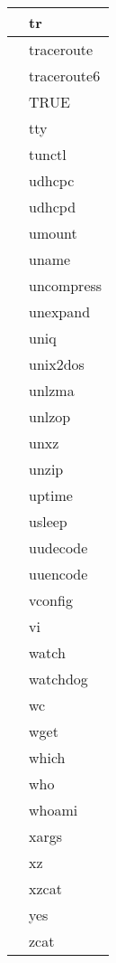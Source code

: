 \begin{longtable}{p{64mm}p{64mm}}
      & tr \\
     \hline
      & traceroute \\
     \hline
      & traceroute6 \\
     \hline
      & TRUE \\
     \hline
      & tty \\
     \hline
      & tunctl \\
     \hline
      & udhcpc \\
     \hline
      & udhcpd \\
     \hline
      & umount \\
     \hline
      & uname \\
     \hline
      & uncompress \\
     \hline
      & unexpand \\
     \hline
      & uniq \\
     \hline
      & unix2dos \\
     \hline
      & unlzma \\
     \hline
      & unlzop \\
     \hline
      & unxz \\
     \hline
      & unzip \\
     \hline
      & uptime \\
     \hline
      & usleep \\
     \hline
      & uudecode \\
     \hline
      & uuencode \\
     \hline
      & vconfig \\
     \hline
      & vi \\
     \hline
      & watch \\
     \hline
      & watchdog \\
     \hline
      & wc \\
     \hline
      & wget \\
     \hline
      & which \\
     \hline
      & who \\
     \hline
      & whoami \\
     \hline
      & xargs \\
     \hline
      & xz \\
     \hline
      & xzcat \\
     \hline
      & yes \\
     \hline
      & zcat \\
     \hline
\end{longtable}

